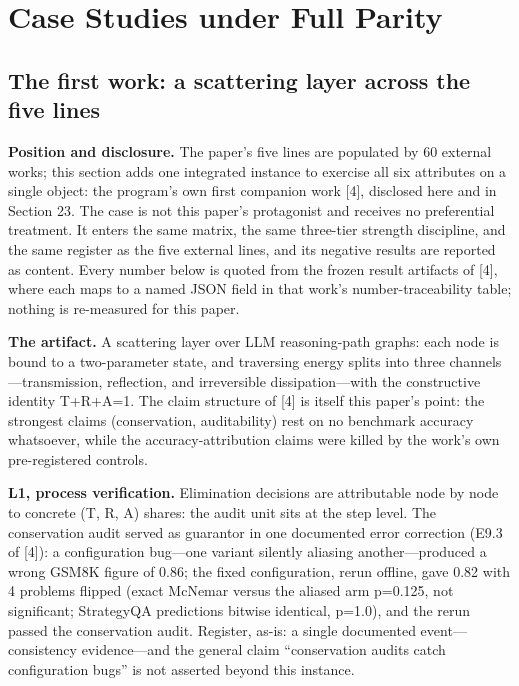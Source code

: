 \documentclass[11pt]{article}
\begin{document}
\section{Case Studies under Full Parity}
\label{sec:18}
\subsection{The first work: a scattering layer across the five lines}
\noindent \textbf{Position and disclosure.} The paper's five lines are populated by 60 external works; this section adds one integrated instance to exercise all six attributes on a single object: the program's own first companion work [4], disclosed here and in Section 23. The case is not this paper's protagonist and receives no preferential treatment. It enters the same matrix, the same three-tier strength discipline, and the same register as the five external lines, and its negative results are reported as content. Every number below is quoted from the frozen result artifacts of [4], where each maps to a named JSON field in that work's number-traceability table; nothing is re-measured for this paper.\par
\noindent \textbf{The artifact.} A scattering layer over LLM reasoning-path graphs: each node is bound to a two-parameter state, and traversing energy splits into three channels—transmission, reflection, and irreversible dissipation—with the constructive identity T+R+A=1. The claim structure of [4] is itself this paper's point: the strongest claims (conservation, auditability) rest on no benchmark accuracy whatsoever, while the accuracy-attribution claims were killed by the work's own pre-registered controls.\par
\noindent \textbf{L1, process verification.} Elimination decisions are attributable node by node to concrete (T, R, A) shares: the audit unit sits at the step level. The conservation audit served as guarantor in one documented error correction (E9.3 of [4]): a configuration bug—one variant silently aliasing another—produced a wrong GSM8K figure of 0.86; the fixed configuration, rerun offline, gave 0.82 with 4 problems flipped (exact McNemar versus the aliased arm p=0.125, not significant; StrategyQA predictions bitwise identical, p=1.0), and the rerun passed the conservation audit. Register, as-is: a single documented event—consistency evidence—and the general claim ``conservation audits catch configuration bugs'' is not asserted beyond this instance.\par
\end{document}
